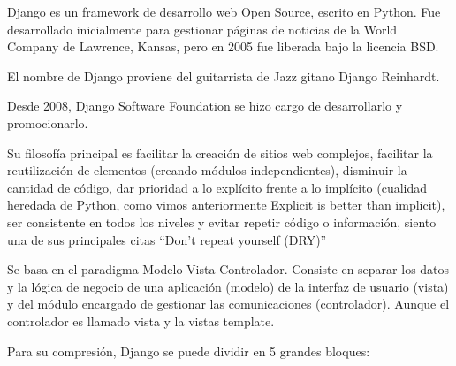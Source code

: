 Django es un framework de desarrollo web Open Source, escrito en Python. Fue desarrollado inicialmente para gestionar páginas de noticias de la World Company de Lawrence, Kansas, pero en 2005 fue liberada bajo la licencia BSD.


El nombre de Django proviene del guitarrista de Jazz gitano Django Reinhardt.


Desde 2008, Django Software Foundation se hizo cargo de desarrollarlo y promocionarlo.


Su filosofía principal es facilitar la creación de sitios web complejos, facilitar la reutilización de elementos (creando módulos independientes), disminuir la cantidad de código, dar prioridad a lo explícito frente a lo implícito (cualidad heredada de Python, como vimos anteriormente Explicit is better than implicit), ser consistente en todos los niveles y evitar repetir código o información, siento una de sus principales citas “Don’t repeat yourself (DRY)”


Se basa en el paradigma Modelo-Vista-Controlador. Consiste en separar los datos y la lógica de negocio de una aplicación (modelo) de la interfaz de usuario (vista)  y del módulo encargado de gestionar las comunicaciones (controlador).  Aunque el controlador es llamado vista y la vistas template. 


Para su compresión, Django se puede dividir en 5 grandes bloques:


